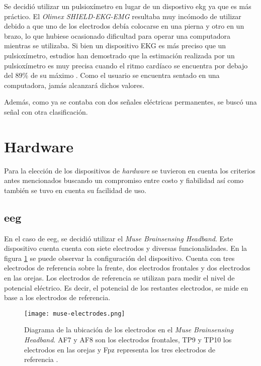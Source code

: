 Se decidió utilizar un pulsioxímetro en lugar de un dispostivo \acrshort{ekg} ya que es más práctico. El \emph{Olimex SHIELD-EKG-EMG} resultaba muy incómodo de utilizar debido a que uno de los electrodos debía colocarse en una pierna y otro en un brazo, lo que hubiese ocasionado dificultad para operar una computadora mientras se utilizaba. Si bien un dispositivo EKG es más preciso que un pulsioxímetro, estudios han demostrado que la estimación realizada por un pulsioxímetro es muy precisa cuando el ritmo cardíaco se encuentra por debajo del $89\% $ de su máximo \cite{spo2-accuracy}. Como el usuario se encuentra sentado en una computadora, jamás alcanzará dichos valores.

Además, como ya se contaba con dos señales eléctricas permanentes, se buscó una señal con otra clasificación.

\section{Hardware}

Para la elección de los dispositivos de \emph{hardware} se tuvieron en cuenta los criterios antes mencionados buscando un compromiso entre costo y fiabilidad así como también se tuvo en cuenta su facilidad de uso.

\subsection{\acrshort{eeg}}

En el caso de \acrshort{eeg}, se decidió utilizar el \emph{Muse Brainsensing Headband}. Este dispositivo cuenta cuenta con siete electrodos y diversas funcionalidades. En la figura \ref{fig:muse-electrodes} se puede observar la configuración del dispositivo. Cuenta con tres electrodos de referencia sobre la frente, dos electrodos frontales y dos electrodos en las orejas. Los electrodos de referencia se utilizan para medir el nivel de potencial eléctrico. Es decir, el potencial de los restantes electrodos, se mide en base a los electrodos de referencia.

\begin{figure}[H]
	\centering
    \texttt{[image: muse-electrodes.png]}
    \caption{Diagrama de la ubicación de los electrodos en el \emph{Muse Brainsensing Headband}. AF7 y AF8 son los electrodos frontales, TP9 y TP10 los electrodos en las orejas y Fpz representa los tres electrodos de referencia \cite{muse-hardware}.}
	\label{fig:muse-electrodes}
\end{figure}

